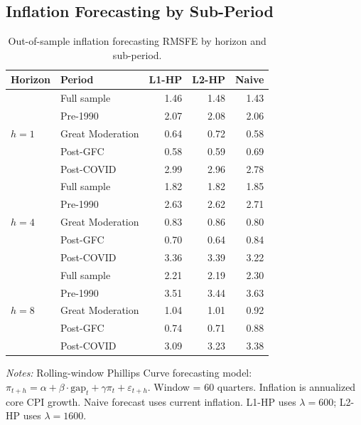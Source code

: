 \documentclass[10pt]{article}
\begin{document}
\subsection{Inflation Forecasting by Sub-Period}
\label{app:inflation_subperiod}

\begin{table}[htbp]
\centering
\caption{Out-of-sample inflation forecasting RMSFE by horizon and sub-period.}
\label{tab:inflation_subperiod}
\begin{tabular}{l l rrr}
\toprule
Horizon & Period & L1-HP & L2-HP & Naive \\
\midrule
\multirow{5}{*}{$h = 1$}
 & Full sample        & 1.46 & 1.48 & 1.43 \\
 & Pre-1990           & 2.07 & 2.08 & 2.06 \\
 & Great Moderation   & 0.64 & 0.72 & 0.58 \\
 & Post-GFC           & 0.58 & 0.59 & 0.69 \\
 & Post-COVID         & 2.99 & 2.96 & 2.78 \\
\midrule
\multirow{5}{*}{$h = 4$}
 & Full sample        & 1.82 & 1.82 & 1.85 \\
 & Pre-1990           & 2.63 & 2.62 & 2.71 \\
 & Great Moderation   & 0.83 & 0.86 & 0.80 \\
 & Post-GFC           & 0.70 & 0.64 & 0.84 \\
 & Post-COVID         & 3.36 & 3.39 & 3.22 \\
\midrule
\multirow{5}{*}{$h = 8$}
 & Full sample        & 2.21 & 2.19 & 2.30 \\
 & Pre-1990           & 3.51 & 3.44 & 3.63 \\
 & Great Moderation   & 1.04 & 1.01 & 0.92 \\
 & Post-GFC           & 0.74 & 0.71 & 0.88 \\
 & Post-COVID         & 3.09 & 3.23 & 3.38 \\
\bottomrule
\end{tabular}
\begin{tablenotes}
\small
\item \textit{Notes:} Rolling-window Phillips Curve forecasting model: $\pi_{t+h} = \alpha + \beta \cdot \text{gap}_t + \gamma \pi_t + \varepsilon_{t+h}$. Window = 60 quarters. Inflation is annualized core CPI growth. Naive forecast uses current inflation. L1-HP uses $\lambda = 600$; L2-HP uses $\lambda = 1600$.
\end{tablenotes}
\end{table}
\end{document}
